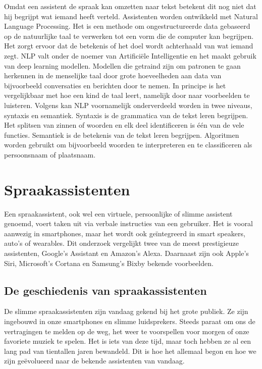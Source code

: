 Omdat een assistent de spraak kan omzetten naar tekst betekent dit nog niet dat hij begrijpt wat iemand heeft verteld. Assistenten worden ontwikkeld met Natural Language Processing. Het is een methode om ongestructureerde data gebaseerd op de natuurlijke taal te verwerken tot een vorm die de computer kan begrijpen. Het zorgt ervoor dat de betekenis of het doel wordt achterhaald van wat iemand zegt. NLP valt onder de noemer van Artificiële Intelligentie en het maakt gebruik van deep learning modellen. Modellen die getraind zijn om patronen te gaan herkennen in de menselijke taal door grote hoeveelheden aan data van bijvoorbeeld conversaties en berichten door te nemen. In principe is het vergelijkbaar met hoe een kind de taal leert, namelijk door naar voorbeelden te luisteren. \autocite{Rouse2017}
Volgens \autocite{Garbade2018} kan NLP voornamelijk onderverdeeld worden in twee niveaus, syntaxis en semantiek. Syntaxis is de grammatica van de tekst leren begrijpen. Het splitsen van zinnen of woorden en elk deel identificeren is één van de vele functies. Semantiek is de betekenis van de tekst leren begrijpen. Algoritmen worden gebruikt om bijvoorbeeld woorden te interpreteren en te classificeren als persoonsnaam of plaatsnaam.

\section{Spraakassistenten}
Een spraakassistent, ook wel een virtuele, persoonlijke of slimme assistent genoemd, voert taken uit via verbale instructies van een gebruiker. Het is vooral aanwezig in smartphones, maar het wordt ook geïntegreerd in smart speakers, auto's of wearables. Dit onderzoek vergelijkt twee van de meest prestigieuze assistenten, Google’s Assistant en Amazon’s Alexa. Daarnaast zijn ook Apple's Siri, Microsoft's Cortana en Samsung's Bixby bekende voorbeelden.

\subsection{De geschiedenis van spraakassistenten}
De slimme spraakassistenten zijn vandaag gekend bij het grote publiek. Ze zijn ingebouwd in onze smartphones en slimme luidsprekers. Steeds paraat om ons de vertragingen te melden op de weg, het weer te voorspellen voor morgen of onze favoriete muziek te spelen. Het is iets van deze tijd, maar toch hebben ze al een lang pad van tientallen jaren bewandeld. Dit is hoe het allemaal begon en hoe we zijn geëvolueerd naar de bekende assistenten van vandaag.

